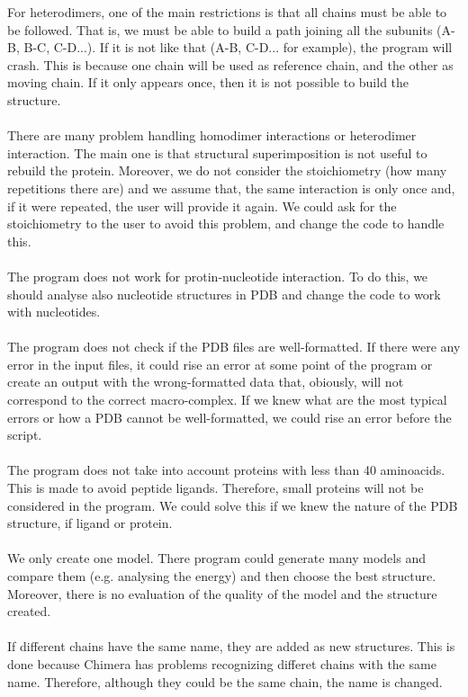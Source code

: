 \documentclass[a4paper,10pt]{report}
\begin{document}
For heterodimers, one of the main restrictions is that all chains must be able to be followed. That is, we must be able to build a path joining all the subunits (A-B, B-C, C-D...). If it is not like that (A-B, C-D... for example), the program will crash. This is because one chain will be used as reference chain, and the other as moving chain. If it only appears once, then it is not possible to build the structure.\\\\
There are many problem handling homodimer interactions or heterodimer interaction. The main one is that structural superimposition is not useful to rebuild the protein. Moreover, we do not consider the stoichiometry (how many repetitions there are) and we assume that, the same interaction is only once and, if it were repeated, the user will provide it again. We could ask for the stoichiometry to the user to avoid this problem, and change the code to handle this.\\\\
The program does not work for protin-nucleotide interaction. To do this, we should analyse also nucleotide structures in PDB and change the code to work with nucleotides.\\\\
The program does not check if the PDB files are well-formatted. If there were any error in the input files, it could rise an error at some point of the program or create an output with the wrong-formatted data that, obiously, will not correspond to the correct macro-complex. If we knew what are the most typical errors or how a PDB cannot be well-formatted, we could rise an error before the script.\\\\
The program does not take into account proteins with less than 40 aminoacids. This is made to avoid peptide ligands. Therefore, small proteins will not be considered in the program. We could solve this if we knew the nature of the PDB structure, if ligand or protein.\\\\
We only create one model. There program could generate many models and compare them (e.g. analysing the energy) and then choose the best structure. Moreover, there is no evaluation of the quality of the model and the structure created.\\\\
If different chains have the same name, they are added as new structures. This is done because Chimera has problems recognizing differet chains with the same name. Therefore, although they could be the same chain, the name is changed.\\\\
\end{document}
